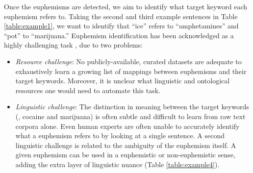 Once the euphemisms are detected, we aim to identify what target keyword each euphemism refers to. 
Taking the second and third example sentences in Table \ref{table:example1}, we want to identify that ``ice'' refers to ``amphetamines'' and  ``pot''  to  ``marijuana.'' 
Euphemism identification has been acknowledged as a highly challenging task \cite{yuan2018reading}, due to two problems: 
\begin{itemize}%
	\item \textit{Resource challenge}: 
	No publicly-available, curated datasets are adequate to exhaustively learn a growing list of mappings between euphemisms and their target keywords. Moreover, it is unclear what linguistic and ontological resources one would need to automate this task.  
	\item \textit{Linguistic challenge}: 
	The distinction in meaning between the target keywords  (\eg, cocaine and marijuana) is often subtle and difficult to learn from raw text corpora alone. 
	Even human experts are often unable to accurately identify what a euphemism refers to by looking at a single  sentence. 
	A second linguistic challenge is related to the ambiguity of the euphemism itself. 
	A given euphemism can  be used in a euphemistic or non-euphemistic sense, adding the extra layer of linguistic nuance (Table \ref{table:example4}). 
\end{itemize}



